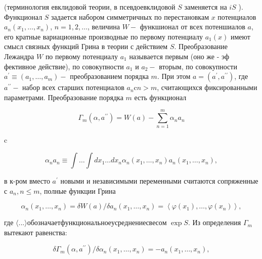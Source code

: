 \documentclass[10pt]{article}
\begin{document}
(терминология евклидовой теории, в псевдоевклидовой $S$ заменяется на $i S$ ). Функционал $S$ задается набором симметричных по перестановкам $x$ потенциалов $a_{n}\left(x_{1}, \ldots, x_{n}\right)$, $n=1,2, \ldots$, величина $W-$ функшионал от всех потеншиалов $a$, его кратные вариационные производные по первому потенциалу $a_{1}(x)$ имеют смысл связных функций Грина в теории с действием $S$. Преобразование Лежандра $W$ по первому потенциалу $a_{1}$ называется первым (оно же - эф фективное действие), по совокупности $a_{1}$ и $a_{2}-$ вторым, по совокупности $a^{\prime} \equiv\left(a_{1}, \ldots, a_{m}\right)-$ преобразованием порядка $m$. При этом $a=\left(a^{\prime}, a^{\prime \prime}\right)$, где $a^{\prime \prime}-$ набор всех старших потенциалов $a_{n} \mathrm{c} n>m$, считающихся фиксированными параметрами. Преобразование порядка $m$ есть функционал



\[

\Gamma_{m}\left(\alpha, a^{\prime \prime}\right)=W(a)-\sum_{n=1}^{m} \alpha_{n} a_{n}

\]



c



\[

\alpha_{n} a_{n} \equiv \int \ldots \int d x_{1} \ldots d x_{n} \alpha_{n}\left(x_{1}, \ldots, x_{n}\right) a_{n}\left(x_{1}, \ldots, x_{n}\right),

\]



в к-ром вместо $a^{\prime}$ новыми и независимыми переменными считаются сопряженные с $a_{n}, n \leqslant m$, полные функции Грина



\[

\alpha_{n}\left(x_{1}, \ldots, x_{n}\right)=\delta W(a) / \delta a_{n}\left(x_{1}, \ldots, x_{n}\right)=\left\langle\varphi\left(x_{1}\right), \ldots, \varphi\left(x_{n}\right)\right\rangle,

\]



где $\langle. .$.$\rangle обозначает функциональное усреднение с весом$ $\exp S$. Из определения $\Gamma_{m}$ вытекают равенства:



\[

\delta \Gamma_{m}\left(\alpha, a^{\prime \prime}\right) / \delta \alpha_{n}\left(x_{1}, \ldots, x_{n}\right)=-a_{n}\left(x_{1}, \ldots, x_{n}\right),

\]
\end{document}
